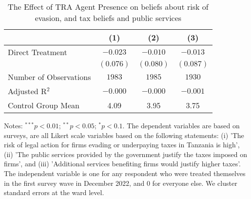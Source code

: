 
\begin{table}
\caption{The Effect of TRA Agent Presence on beliefs about risk of evasion, and tax beliefs and public services}
\begin{center}
\begin{threeparttable}
\begin{tabular}{l c c c}
\toprule
 & (1) & (2) & (3) \\
\midrule
Direct Treatment       & $-0.023$  & $-0.010$  & $-0.013$  \\
                       & $(0.076)$ & $(0.080)$ & $(0.087)$ \\
\midrule
Number of Observations & $1983$    & $1985$    & $1930$    \\
Adjusted R$^2$         & $-0.000$  & $-0.000$  & $-0.001$  \\
Control Group Mean     & 4.09      & 3.95      & 3.75      \\
\bottomrule
\end{tabular}
\begin{tablenotes}[flushleft]
\scriptsize{Notes: $^{***}p<0.01$; $^{**}p<0.05$; $^{*}p<0.1$. The dependent variables are based on surveys, are all Likert scale variables based on the following statements: (i) 'The risk of legal action for firms evading or underpaying taxes in Tanzania is high', (ii) 'The public services provided by the government justify the taxes imposed on firms', and (iii) 'Additional services benefiting firms would justify higher taxes'. The independent variable is one for any respondent who were treated themselves in the first survey wave in December 2022, and 0 for everyone else. We cluster standard errors at the ward level.}
\end{tablenotes}
\end{threeparttable}
\label{table:coefficients}
\end{center}
\end{table}
